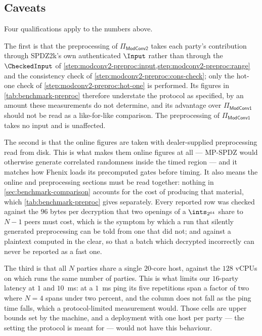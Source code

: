 \subsection{Caveats}
\label{sec:benchmark-caveats}

Four qualifications apply to the numbers above.

The first is that the preprocessing of $\Pi_\mathsf{ModConv2}$ takes each party's contribution through SPDZ2k's own authenticated $\Input$ rather than through the $\CheckedInput$ of \cref{step:modconv2-preproc:input,step:modconv2-preproc:range} and the consistency check of \cref{step:modconv2-preproc:cons-check};
only the hot-one check of \cref{step:modconv2-preproc:hot-one} is performed.
Its figures in \cref{tab:benchmark-preproc} therefore understate the protocol as specified, by an amount these measurements do not determine, and its advantage over $\Pi_\mathsf{ModConv1}$ should not be read as a like-for-like comparison.
The preprocessing of $\Pi_\mathsf{ModConv1}$ takes no input and is unaffected.

The second is that the online figures are taken with dealer-supplied preprocessing read from disk.
This is what makes them online figures at all --- MP-SPDZ would otherwise generate correlated randomness inside the timed region --- and it matches how Fhenix loads its precomputed gates before timing.
It also means the online and preprocessing sections must be read together: nothing in \cref{sec:benchmark-comparison} accounts for the cost of producing that material, which \cref{tab:benchmark-preproc} gives separately.
Every reported row was checked against the $96$ bytes per decryption that two openings of a $\ints_{2^{64}}$ share to $N-1$ peers must cost, which is the symptom by which a run that silently generated preprocessing can be told from one that did not; and against a plaintext computed in the clear, so that a batch which decrypted incorrectly can never be reported as a fast one.

The third is that all $N$ parties share a single $20$-core host, against the $128$ vCPUs on which \cite{CCS:ZZLP25} runs the same number of parties.
This is what limits our $16$-party latency at $1$ and $10$~ms: at a $1$~ms ping its five repetitions span a factor of two where $N = 4$ spans under two percent, and the column does not fall as the ping time falls, which a protocol-limited measurement would.
Those cells are upper bounds set by the machine, and a deployment with one host per party --- the setting the protocol is meant for --- would not have this behaviour.

